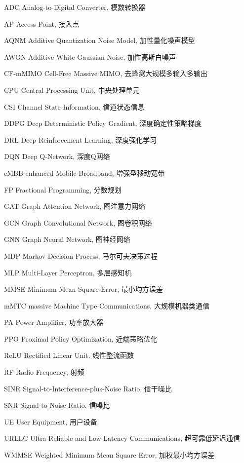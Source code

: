\begin{abbreviation}[2cm]
\setlength{\itemindent}{1cm} %

\item[ADC] Analog-to-Digital Converter, 模数转换器
\item[AP] Access Point, 接入点
\item[AQNM] Additive Quantization Noise Model, 加性量化噪声模型
\item[AWGN] Additive White Gaussian Noise, 加性高斯白噪声
\item[CF-mMIMO] Cell-Free Massive MIMO, 去蜂窝大规模多输入多输出
\item[CPU] Central Processing Unit, 中央处理单元
\item[CSI] Channel State Information, 信道状态信息
\item[DDPG] Deep Deterministic Policy Gradient, 深度确定性策略梯度
\item[DRL] Deep Reinforcement Learning, 深度强化学习
\item[DQN] Deep Q-Network, 深度Q网络
\item[eMBB] enhanced Mobile Broadband, 增强型移动宽带
\item[FP] Fractional Programming, 分数规划
\item[GAT] Graph Attention Network, 图注意力网络
\item[GCN] Graph Convolutional Network, 图卷积网络
\item[GNN] Graph Neural Network, 图神经网络
\item[MDP] Markov Decision Process, 马尔可夫决策过程
\item[MLP] Multi-Layer Perceptron, 多层感知机
\item[MMSE] Minimum Mean Square Error, 最小均方误差
\item[mMTC] massive Machine Type Communications, 大规模机器类通信
\item[PA] Power Amplifier, 功率放大器
\item[PPO] Proximal Policy Optimization, 近端策略优化
\item[ReLU] Rectified Linear Unit, 线性整流函数
\item[RF] Radio Frequency, 射频
\item[SINR] Signal-to-Interference-plus-Noise Ratio, 信干噪比
\item[SNR] Signal-to-Noise Ratio, 信噪比
\item[UE] User Equipment, 用户设备
\item[URLLC] Ultra-Reliable and Low-Latency Communications, 超可靠低延迟通信
\item[WMMSE] Weighted Minimum Mean Square Error, 加权最小均方误差

\end{abbreviation}
